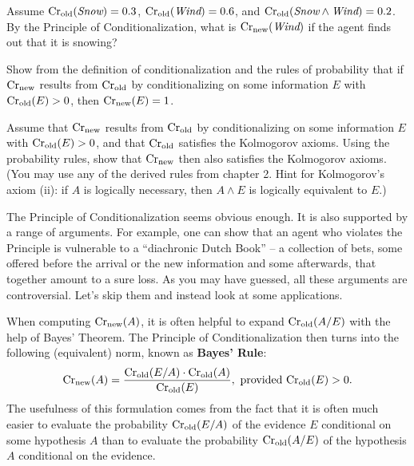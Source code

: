 \begin{exercise1}
  Assume $\text{Cr$_{\text{old}}$}(\emph{Snow}) = 0.3$, $\text{Cr$_{\text{old}}$}(\emph{Wind}) = 0.6$, and
  $\text{Cr$_{\text{old}}$}(\emph{Snow} \land \emph{Wind}) = 0.2$. By the Principle of
  Conditionalization, what is $\text{Cr$_{\text{new}}$}(\emph{Wind})$ if the agent finds
  out that it is snowing? 
\end{exercise1}


\begin{exercise2}
  Show from the definition of conditionalization and the rules of
  probability that if $\text{Cr$_{\text{new}}$}$ results from $\text{Cr$_{\text{old}}$}$ by conditionalizing
  on some information $E$ with $\text{Cr$_{\text{old}}$}(E) > 0$, then $\text{Cr$_{\text{new}}$}(E) = 1$.
\end{exercise2}



\begin{exercise3}
  Assume that $\text{Cr$_{\text{new}}$}$ results from $\text{Cr$_{\text{old}}$}$ by conditionalizing on some
  information $E$ with $\text{Cr$_{\text{old}}$}(E) > 0$, and that $\text{Cr$_{\text{old}}$}$ satisfies the
  Kolmogorov axioms. Using the probability rules, show that $\text{Cr$_{\text{new}}$}$
  then also satisfies the Kolmogorov axioms. (You may use any of the
  derived rules from chapter 2. Hint for Kolmogorov's axiom (ii): if
  $A$ is logically necessary, then $A\land E$ is logically equivalent
  to $E$.)
\end{exercise3}


The Principle of Conditionalization seems obvious enough. It is also
supported by a range of arguments. For example, one can show that an
agent who violates the Principle is vulnerable to a ``diachronic Dutch
Book'' -- a collection of bets, some offered before the arrival or the
new information and some afterwards, that together amount to a sure
loss. As you may have guessed, all these arguments are
controversial. Let's skip them and instead look at some applications.

When computing $\text{Cr}_\text{new}(A)$, it is often helpful to expand
$\text{Cr}_\text{old}(A/E)$ with the help of Bayes' Theorem. The Principle
of Conditionalization then turns into the following (equivalent) norm,
known as \textbf{Bayes' Rule}:
%
\[
\text{Cr}_{\text{new}}(A) = \frac{\text{Cr}_{\text{old}}(E/A) \cdot \text{Cr}_{\text{old}}(A)}{\text{Cr}_{\text{old}}(E)}, \text{ provided $\text{Cr}_\text{old}(E) > 0$}.
\]
%
The usefulness of this formulation comes from the fact that it is
often much easier to evaluate the probability $\text{Cr$_{\text{old}}$}(E/A)$ of the
evidence $E$ conditional on some hypothesis $A$  than to
evaluate the probability $\text{Cr$_{\text{old}}$}(A/E)$ of the hypothesis $A$ conditional
on the evidence.

